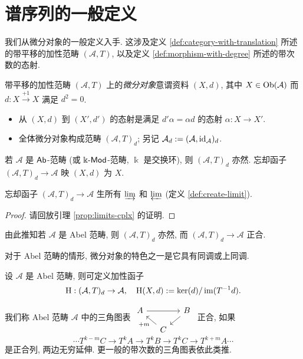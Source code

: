 \section{谱序列的一般定义}\label{sec:spectral-sequence}
我们从微分对象的一般定义入手. 这涉及定义 \ref{def:category-with-translation} 所述的带平移的加性范畴 $(\mathcal{A}, T)$, 以及定义 \ref{def:morphism-with-degree} 所述的带次数的态射.

\begin{definition}\label{def:differential-object}
	带平移的加性范畴 $(\mathcal{A}, T)$ 上的\emph{微分对象}意谓资料 $(X,d)$, 其中 $X \in \operatorname{Ob}(\mathcal{A})$ 而 $d: X \xrightarrow{+1} X$ 满足 $d^2 = 0$.
	\begin{itemize}
		\item 从 $(X, d)$ 到 $(X', d')$ 的态射是满足 $d' \alpha = \alpha d$ 的态射 $\alpha: X \to X'$.
		\item 全体微分对象构成范畴 $(\mathcal{A}, T)_d$; 另记 $\mathcal{A}_d := (\mathcal{A}, \mathrm{id}_{\mathcal{A}})_d$.
	\end{itemize}
\end{definition}

若 $\mathcal{A}$ 是 $\mathsf{Ab}$-范畴 (或 $\Bbbk\text{-}\mathsf{Mod}$-范畴, $\Bbbk$ 是交换环), 则 $(\mathcal{A}, T)_d$ 亦然. 忘却函子 $(\mathcal{A}, T)_d \to \mathcal{A}$ 映 $(X,d)$ 为 $X$.

\begin{proposition}
	忘却函子 $(\mathcal{A}, T)_d \to \mathcal{A}$ 生所有 $\varinjlim$ 和 $\varprojlim$ (定义 \ref{def:create-limit}).
\end{proposition}
\begin{proof}
	请回放引理 \ref{prop:limits-cplx} 的证明.
\end{proof}

由此推知若 $\mathcal{A}$ 是 Abel 范畴, 则 $(\mathcal{A}, T)_d$ 亦然, 而 $(\mathcal{A}, T)_d \to \mathcal{A}$ 正合.

对于 Abel 范畴的情形, 微分对象的特色之一是它具有同调或上同调.

\begin{definition}
	设 $\mathcal{A}$ 是 Abel 范畴, 则可定义加性函子
	\[ \operatorname{H}: (\mathcal{A}, T)_d \to \mathcal{A}, \quad \operatorname{H}(X,d) := \operatorname{ker}(d)/\operatorname{im}(T^{-1} d) .\]
\end{definition}

我们称 Abel 范畴 $\mathcal{A}$ 中的三角图表
$\begin{tikzcd}[column sep=small, row sep=small]
	A \arrow[rr] & & B \arrow[ld] \\
	& C \arrow[lu, "+m"] &
\end{tikzcd}$
正合, 如果
\[ \cdots T^{k-m} C \to T^k A \to T^k B \to T^k C \to T^{k+m} A \cdots \]
是正合列, 两边无穷延伸. 更一般的带次数的三角图表依此类推.

